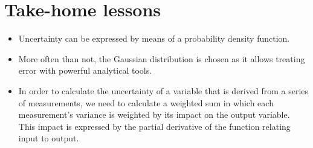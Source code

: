\section{Take-home lessons}
\begin{itemize}
\item Uncertainty can be expressed by means of a probability density function.
\item More often than not, the Gaussian distribution is chosen as it allows treating error with powerful analytical tools.
\item In order to calculate the uncertainty of a variable that is derived from a series of measurements, we need to calculate a weighted sum in which each measurement's variance is weighted by its impact on the output variable. This impact is expressed by the partial derivative of the function relating input to output.
\end{itemize}

